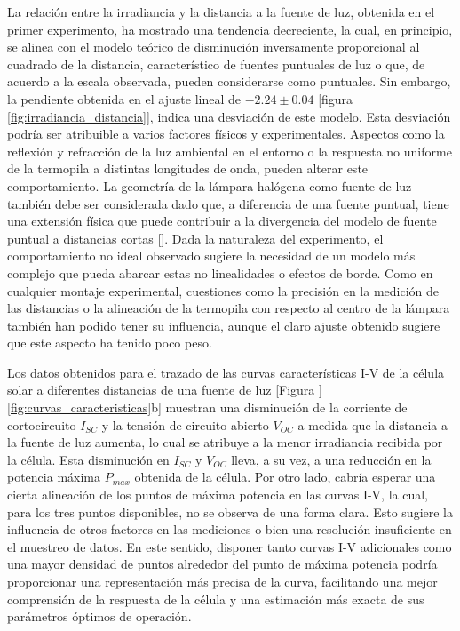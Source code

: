 La relación entre la irradiancia y la distancia a la fuente de luz, obtenida en el primer experimento, ha mostrado una tendencia decreciente, la cual, en principio, se alinea con el modelo teórico de disminución inversamente proporcional al cuadrado de la distancia, característico de fuentes puntuales de luz o que, de acuerdo a la escala observada, pueden considerarse como puntuales. Sin embargo, la pendiente obtenida en el ajuste lineal de $-2.24 \pm 0.04$ [figura \ref{fig:irradiancia_distancia}],  indica una desviación de este modelo. Esta desviación podría ser atribuible a varios factores físicos y experimentales. Aspectos como la reflexión y refracción de la luz ambiental en el entorno o la respuesta no uniforme de la termopila a distintas longitudes de onda, pueden alterar este comportamiento. La geometría de la lámpara halógena como fuente de luz también debe ser considerada dado que, a diferencia de una fuente puntual, tiene una extensión física que puede contribuir a la divergencia del modelo de fuente puntual a distancias cortas [\cite{Shibuya_notsquared}]. Dada la naturaleza del experimento, el comportamiento no ideal observado sugiere la necesidad de un modelo más complejo que pueda abarcar estas no linealidades o efectos de borde. Como en cualquier montaje experimental, cuestiones como la precisión en la medición de las distancias o la alineación de la termopila con respecto al centro de la lámpara también han podido tener su influencia, aunque el claro ajuste obtenido sugiere que este aspecto ha tenido poco peso.




\vspace{\baselineskip}	

Los datos obtenidos para el trazado de las curvas características I-V  de la célula solar a diferentes distancias de una fuente de luz [Figura ]\ref{fig:curvas_caracteristicas}b] muestran una disminución de la corriente de cortocircuito $I_{SC}$ y la tensión de circuito abierto $V_{OC}$ a medida que la distancia a la fuente de luz aumenta, lo cual se atribuye a la menor irradiancia recibida por la célula. Esta disminución en $I_{SC}$ y $V_{OC}$ lleva, a su vez, a una reducción en la potencia máxima $P_{max}$ obtenida de la célula. Por otro lado, cabría esperar una cierta alineación de los puntos de máxima potencia en las curvas I-V, la cual, para los tres puntos disponibles, no se observa de una forma clara. Esto sugiere la influencia de otros factores en las mediciones o bien una resolución insuficiente en el muestreo de datos. En este sentido, disponer tanto curvas I-V adicionales como una mayor densidad de puntos alrededor del punto de máxima potencia podría proporcionar una representación más precisa de la curva, facilitando una mejor comprensión de la respuesta de la célula y una estimación más exacta de sus parámetros óptimos de operación.  



